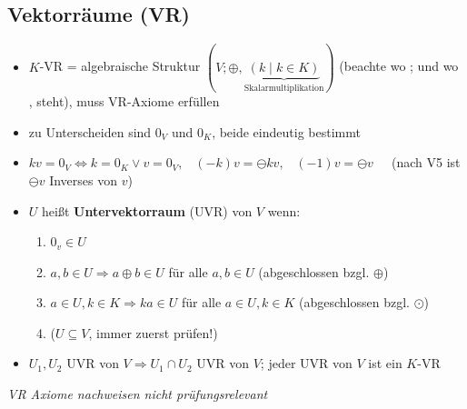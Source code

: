 \documentclass[10pt,a4paper]{article}
\begin{document}
\subsection{Vektorräume (VR)}
\begin{itemize}


\item $K$-VR = algebraische Struktur $(V; \oplus , \underbrace{(k \mid k \in K)}_{\text{Skalarmultiplikation}})$ (beachte wo ; und wo , steht), muss VR-Axiome erfüllen
\item zu Unterscheiden sind $0_{V}$ und $0_{K}$, beide eindeutig bestimmt 
\item $kv=0_{V} \Leftrightarrow k=0_{K} \lor v=0_{V},\;\;\; (-k)v=\ominus kv, \;\;\; (-1)v=\ominus v\;\;\;\;$ (nach V5 ist $\ominus v$ Inverses von $v$)
\item $U$ heißt \textbf{Untervektorraum} (UVR) von $V$ wenn: 
\begin{enumerate} 
\item $0_{v} \in U$
\item $a,b\in U \Rightarrow a\oplus b \in U$ für alle $a,b \in U$ (abgeschlossen bzgl. $\oplus$)
\item $a\in U, k\in K \Rightarrow ka \in U$ für alle $a\in U,k\in K$ (abgeschlossen bzgl. $\odot$)
\item ($U\subseteq V$, immer zuerst prüfen!)
\end{enumerate}
\item $U_{1},U_{2}$ UVR von $V \Rightarrow U_{1} \cap U_{2}$ UVR von $V$; jeder UVR von $V$ ist ein $K$-VR
\end{itemize} 
\textit{VR Axiome nachweisen nicht prüfungsrelevant}
\end{document}
